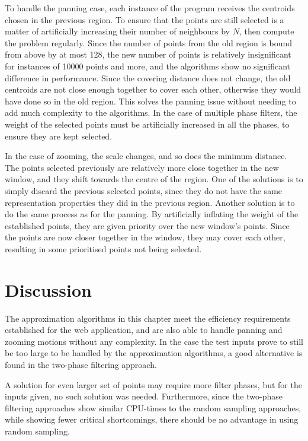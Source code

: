 To handle the panning case, each instance of the program receives the centroids chosen in the previous region. To ensure that the points are still selected is a matter of artificially increasing their number of neighbours by $N$, then compute the problem regularly.  Since the number of points from the old region is bound from above by at most 128, the new number of points is relatively insignificant for instances of 10000 points and more, and the algorithms show no significant difference in performance. Since the covering distance does not change, the old centroids are not close enough together to cover each other, otherwise they would have done so in the old region. This solves the panning issue without needing to add much complexity to the algorithms. In the case of multiple phase filters, the weight of the selected points must be artificially increased in all the phases, to ensure they are kept selected.



In the case of zooming, the scale changes, and so does the minimum distance. The points selected previously are relatively more close together in the new window, and they shift towards the centre of the region. One of the solutions is to simply discard the previous selected points, since they do not have the same representation properties they did in the previous region. Another solution is to do the same process as for the panning. By artificially inflating the weight of the established points, they are given priority over the new window's points. Since the points are now closer together in the window, they may cover each other, resulting in some prioritised points not being selected. 



\section{Discussion}
The approximation algorithms in this chapter meet the efficiency requirements established for the web application, and are also able to handle panning and zooming motions without any complexity. In the case the test inputs prove to still be too large to be handled by the approximation algorithms, a good alternative is found in the two-phase filtering approach.

A solution for even larger set of points may require more filter phases, but for the inputs given, no such solution was needed. Furthermore, since the two-phase filtering approaches show similar CPU-times to the random sampling approaches, while showing fewer critical shortcomings, there should be no advantage in using random sampling.